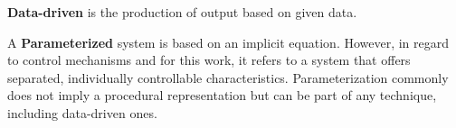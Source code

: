 \textbf{Data-driven} is the production of output based on given data.

A \textbf{Parameterized} system is based on an implicit equation. However, in regard to control mechanisms and for this work, it refers to a system that offers separated, individually controllable characteristics. Parameterization commonly does not imply a procedural representation but can be part of any technique, including data-driven ones.


